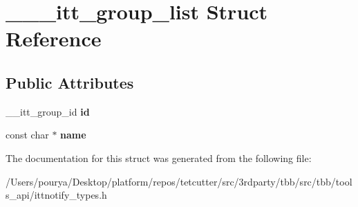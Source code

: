 \hypertarget{struct______itt__group__list}{}\section{\+\_\+\+\_\+\+\_\+itt\+\_\+group\+\_\+list Struct Reference}
\label{struct______itt__group__list}
\subsection*{Public Attributes}
\begin{DoxyCompactItemize}
\item 
\hypertarget{struct______itt__group__list_a0be1db69af1d8a515915bf594f0f9a7e}{}\+\_\+\+\_\+itt\+\_\+group\+\_\+id {\bfseries id}\label{struct______itt__group__list_a0be1db69af1d8a515915bf594f0f9a7e}

\item 
\hypertarget{struct______itt__group__list_a7ec0e147be42b6d715189f283d6d6784}{}const char $\ast$ {\bfseries name}\label{struct______itt__group__list_a7ec0e147be42b6d715189f283d6d6784}

\end{DoxyCompactItemize}


The documentation for this struct was generated from the following file\+:\begin{DoxyCompactItemize}
\item 
/\+Users/pourya/\+Desktop/platform/repos/tetcutter/src/3rdparty/tbb/src/tbb/tools\+\_\+api/ittnotify\+\_\+types.\+h\end{DoxyCompactItemize}

